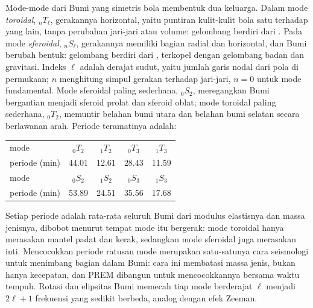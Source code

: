 Mode-mode dari Bumi yang simetris bola membentuk dua keluarga. Dalam
mode \emph{toroidal}, ${}_nT_\ell$, gerakannya horizontal, yaitu puntiran
kulit-kulit bola satu terhadap yang lain, tanpa perubahan jari-jari atau volume: gelombang berdiri
dari . Pada mode \emph{sferoidal}, ${}_nS_\ell$,
gerakannya memiliki bagian radial dan horizontal, dan Bumi berubah bentuk: gelombang
berdiri dari , terkopel dengan gelombang badan dan gravitasi.
Indeks $\ell$ adalah derajat sudut, yaitu jumlah garis nodal dari
pola di permukaan; $n$ menghitung simpul gerakan terhadap jari-jari, $n = 0$
untuk mode fundamental. Mode sferoidal paling sederhana, ${}_0S_2$, meregangkan
Bumi bergantian menjadi sferoid prolat dan sferoid oblat; mode toroidal paling sederhana,
${}_0T_2$, memuntir belahan bumi utara dan belahan bumi selatan secara berlawanan
arah. Periode teramatinya adalah:
\begin{center}
\small
\begin{tabular}{lcccc}
\hline
mode & ${}_0T_2$ & ${}_1T_2$ & ${}_0T_3$ & ${}_1T_3$ \\
periode (\unit{min}) & 44.01 & 12.61 & 28.43 & 11.59 \\
\hline
mode & ${}_0S_2$ & ${}_1S_2$ & ${}_0S_3$ & ${}_1S_3$ \\
periode (\unit{min}) & 53.89 & 24.51 & 35.56 & 17.68 \\
\hline
\end{tabular}
\end{center}
Setiap periode adalah rata-rata seluruh Bumi dari modulus elastisnya dan
massa jenisnya, dibobot menurut tempat mode itu bergerak: mode toroidal hanya merasakan
mantel padat dan kerak, sedangkan mode sferoidal juga merasakan inti.
Mencocokkan periode ratusan mode merupakan satu-satunya cara seismologi untuk menimbang
bagian dalam Bumi: cara ini membatasi massa jenis, bukan hanya kecepatan, dan PREM dibangun untuk
mencocokkannya bersama waktu tempuh. Rotasi dan elipsitas
Bumi memecah tiap mode berderajat $\ell$ menjadi $2\ell + 1$
frekuensi yang sedikit berbeda, analog dengan efek Zeeman.

